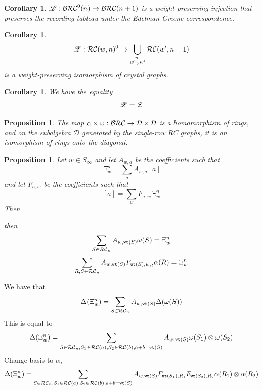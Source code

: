 \documentclass{amsart}
\newtheorem{corollary}[lemma]{Corollary}
\newtheorem{proposition}[lemma]{Proposition}
\theoremstyle{definition}
\theoremstyle{remark}
\numberwithin{equation}{subsection}
\newcommand{\downvar}[1]{\stackrel{#1}{\searrow}}
\newcommand{\wof}[1]{w_{#1}}
\newcommand{\wtt}{\mathtt{wt}}
\newcommand{\zeromap}{\mathcal{Z}}
\newcommand{\dsch}{\ensuremath{\Xi}}
\newcommand{\dcoma}{\mathcal{D}}
\newcommand{\code}{\mathfrak{c}}
\begin{document}
\begin{corollary}
  $\mathscr{L}:\mathcal{BRC}^0(n)\to \mathcal{BRC}(n+1)$ is a weight-preserving injection that preserves the recording tableau under the Edelman-Greene correspondence.
\end{corollary}

\begin{corollary}
$$\lzeromap:\RC(w, n)^0\to \bigcup_{w\downvar{n} w'}\RC(w', n-1)$$ 
	is a weight-preserving isomorphism of crystal graphs.
\end{corollary}


\begin{corollary}
  We have the equality
$$\lzeromap=\zeromap$$ 
\end{corollary}

\begin{proposition}
The map $\alpha\times \omega:\BRC\to \dcoma\times \dcoma$ is a homomorphism of rings, and on the subalgebra $\mathcal{D}$ generated by the single-row RC graphs, it is an isomorphism of rings onto the diagonal.
\end{proposition}

\begin{proposition}
Let $w\in S_\infty$ and let $A_{w,a}$ be the coefficients such that 
$$\dsch_w^n = \sum_a A_{w,a} [a]$$
and let $F_{a,w}$ be the coefficients such that
$$[a] = \sum_w F_{a,w} \dsch_w^n$$
Then

then
$$\sum_{S\in\RC_n} A_{w,\wtt(S)} \omega(S) = \dsch_w^n$$
$$\sum_{R,S\in\RC_n} A_{w,\wtt(S)} F_{\wtt(S),\wof{R}}\alpha(R) = \dsch_w^n$$
\end{proposition}

We have that
$$\Delta(\dsch_w^n) = \sum_{S\in \RC_n}A_{w,\wtt(S)}\Delta(\omega(S))$$
This is equal to
$$\Delta(\dsch_w^n) = \sum_{S\in \RC_n,S_1\in\RC(a),S_2\in\RC(b),a+b=\wtt(S)} A_{w,\wtt(S)} \omega(S_1)\otimes\omega(S_2)$$
Change basis to $\alpha$,
$$\Delta(\dsch_w^n) = \sum_{S\in \RC_n,S_1\in\RC(a),S_2\in\RC(b),a+b=\wtt(S)} A_{w,\wtt(S)}F_{\wtt(S_1),R_1}F_{\wtt(S_2),R_2} \alpha(R_1)\otimes\alpha(R_2)$$
\end{document}
